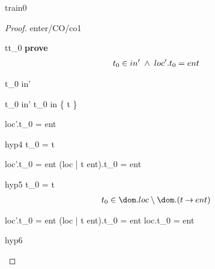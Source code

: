\documentclass[12pt]{amsart}
\begin{document}
\begin{machine}{train0}
\begin{proof}{enter/CO/co1}
\begin{free:var}{t}{t_0}
	\noindent \textbf{prove}
	\begin{align}
		t_0 \in in' 
			\; \land \; loc'.t_0 = ent
	\end{align}
	\begin{by:parts}
	
		\begin{part:a}{ t_0 \in in' }
		\begin{calculation}
			t_0 \in in'
		\hint{=}{ \ref{a1} }
			t_0 \in in \bunion \{ t \}
		\hint{=}{ \eqref{hyp2} }
			\true
		\end{calculation}

		\end{part:a}
		\begin{part:a}{ loc'.t_0 = ent }
		
		\begin{by:cases}
		
		\begin{case}{hyp4}{ t_0 = t}
		\begin{calculation}
			loc'.t_0 = ent
		\hint{=}{ \ref{a2} }
			(loc | t \tfun ent).t_0 = ent
		\hint{=}{ \eqref{hyp4} }
			\true
		\end{calculation}

		\end{case}

		\begin{case}{hyp5}{ \neg t_0 = t}
		\begin{align}
		\assert{hyp6}{ t_0 \in \dom.loc \setminus \dom.(t \tfun ent) }
		\end{align}
		\begin{calculation}
			loc'.t_0 = ent
		\hint{=}{ \ref{a2} }
			(loc | t \tfun ent).t_0 = ent
		\hint{=}{ \eqref{hyp5} \eqref{hyp6} }
			loc.t_0 = ent
		\hint{=}{ \eqref{hyp3} }
			\true
		\end{calculation}
		\begin{subproof}{hyp6}
		\easy
		\end{subproof}
		\end{case}
		

\end{by:cases}
\end{part:a}
\end{by:parts}
\end{free:var}
\end{proof}
\end{machine}
\end{document}
